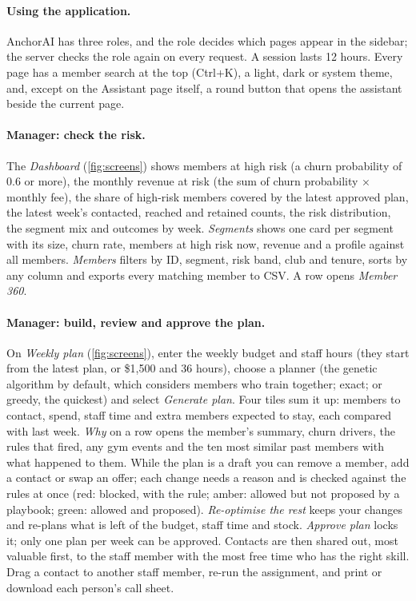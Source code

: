 \documentclass[paper=a4, fontsize=11pt, open=any, parskip=half-,
  headings=small, numbers=noenddot, captions=tableheading, toc=flat]{scrreprt}
\begin{document}
\paragraph{Using the application.} AnchorAI has three roles, and the role decides which pages appear in the sidebar; the server checks the role again on every request. A session lasts 12 hours. Every page has a member search at the top (Ctrl+K), a light, dark or system theme, and, except on the Assistant page itself, a round button that opens the assistant beside the current page.

\paragraph{Manager: check the risk.} The \emph{Dashboard} (\cref{fig:screens}) shows members at high risk (a churn probability of 0.6 or more), the monthly revenue at risk (the sum of churn probability × monthly fee), the share of high-risk members covered by the latest approved plan, the latest week's contacted, reached and retained counts, the risk distribution, the segment mix and outcomes by week. \emph{Segments} shows one card per segment with its size, churn rate, members at high risk now, revenue and a profile against all members. \emph{Members} filters by ID, segment, risk band, club and tenure, sorts by any column and exports every matching member to CSV. A row opens \emph{Member 360}.

\paragraph{Manager: build, review and approve the plan.} On \emph{Weekly plan} (\cref{fig:screens}), enter the weekly budget and staff hours (they start from the latest plan, or \$1,500 and 36 hours), choose a planner (the genetic algorithm by default, which considers members who train together; exact; or greedy, the quickest) and select \emph{Generate plan}. Four tiles sum it up: members to contact, spend, staff time and extra members expected to stay, each compared with last week. \emph{Why} on a row opens the member's summary, churn drivers, the rules that fired, any gym events and the ten most similar past members with what happened to them. While the plan is a draft you can remove a member, add a contact or swap an offer; each change needs a reason and is checked against the rules at once (red: blocked, with the rule; amber: allowed but not proposed by a playbook; green: allowed and proposed). \emph{Re-optimise the rest} keeps your changes and re-plans what is left of the budget, staff time and stock. \emph{Approve plan} locks it; only one plan per week can be approved. Contacts are then shared out, most valuable first, to the staff member with the most free time who has the right skill. Drag a contact to another staff member, re-run the assignment, and print or download each person's call sheet.
\end{document}
